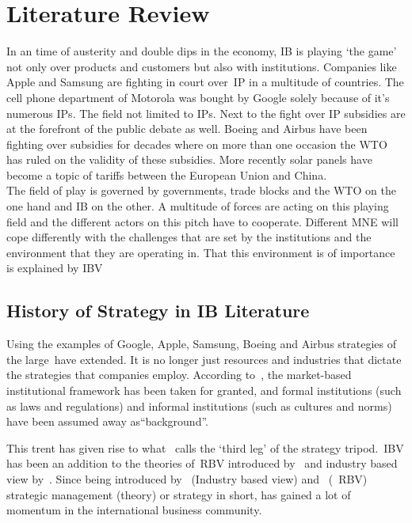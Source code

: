 \chapter{Literature Review}

In an time of austerity and double dips in the economy, \gls{IB} is playing `the game' not only over products and customers but also with institutions. 
Companies like Apple and Samsung are  fighting in court over~\gls{IP} in a multitude of countries. 
The cell phone department of Motorola was bought by Google solely because of it's numerous \glspl{IP}. The field not limited to \glspl{IP}. 
Next to the fight over \gls{IP} subsidies are at the forefront of the public debate as well. 
Boeing and Airbus have been fighting over subsidies for decades where on more than one occasion the \gls{WTO} has ruled on the validity of these subsidies. 
More recently solar panels have become a topic of tariffs between the European Union and China. \\

The field of play is governed by governments, trade blocks and the \gls{WTO} on the one hand and \gls{IB} on the other.
A multitude of forces are acting on this playing field and the different actors on this pitch have to cooperate. 
Different \gls{MNE} will cope differently with the challenges that are set by the institutions and the environment that they are operating in. That this environment is of importance is explained by \gls{IBV}~\cite{Kostova:1999,Meyer:2009,Wang:2012} 

\section{History of Strategy in IB Literature}
Using the examples of Google, Apple, Samsung, Boeing and Airbus strategies of the large~\mne have extended. It is no longer just resources and industries that dictate the strategies that companies employ. 
According to~\cite{Peng:2009}, the market-based institutional framework has been taken for granted, and formal institutions (such as laws and regulations) and informal institutions (such as cultures and norms) have been assumed away as``background''.

This trent has given rise to what~\cite{Peng:2009} calls the `third leg' of the strategy tripod.~\Gls{IBV} has been an addition to the theories of~\gls{RBV} introduced by~\cite{Barney:1991} and industry based view by~\cite{Porter:1980}. 
Since being introduced by~\cite{Porter:1980} (Industry based view) and~\cite{Barney:1991} (~\gls{RBV}) strategic management (theory) or strategy in short, has gained a lot of momentum in the international business community. \\ 

